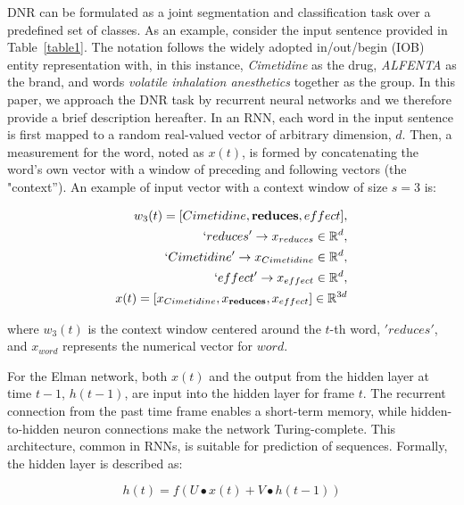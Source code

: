 DNR can be formulated as a joint segmentation and classification task over a predefined set of classes. As an example, consider the input sentence provided in Table~\ref{table1}. The notation follows the widely adopted in/out/begin (IOB) entity representation with, in this instance, \textit{Cimetidine} as the drug, \textit{ALFENTA} as the brand, and words \textit{volatile inhalation anesthetics} together as the group. In this paper, we approach the DNR task by recurrent neural networks and we therefore provide a brief description hereafter. In an RNN, each word in the input sentence is first mapped to a random real-valued  vector of arbitrary dimension, $d$. Then, a measurement for the word, noted as $x(t)$, is formed by concatenating the word's own vector with a window of preceding and following vectors (the "context''). An example of input vector with a context window of size $s = 3$ is:

\vspace{-0.7 cm}

\begin{equation}
\begin{split}
w_{3}(t) = [Cimetidine, \textbf{reduces}, effect], \\
`reduces' \rightarrow x_{reduces} \in \mathbb{R}^{d}, \\
`Cimetidine' \rightarrow x_{Cimetidine} \in \mathbb{R}^{d}, \\
`effect' \rightarrow x_{effect} \in \mathbb{R}^{d}, \\
x(t) = [x_{Cimetidine}, x_{\textbf{reduces}}, x_{effect}] \in \mathbb{R}^{3d}
\end{split}
\end{equation}

\noindent where $w_{3}(t)$ is the context window centered around the $t$-th word, $'reduces'$, and $x_{word}$ represents the numerical vector for $word$.

For the Elman network, both $x(t)$ and the output from the hidden layer at time $t-1$, $h(t -1)$, are input into the hidden layer for frame $t$. The recurrent connection from the past time frame enables a short-term memory, while hidden-to-hidden neuron connections make the network Turing-complete. This architecture, common in RNNs, is suitable for prediction of sequences. Formally, the hidden layer is described as:

\vspace{-0.4 cm}
\begin{equation}
 h(t) = f(U \bullet x(t) + V \bullet h(t-1) )
\end{equation}

